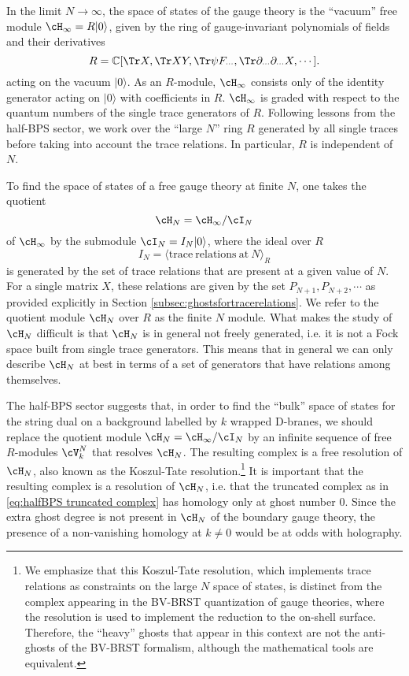 \documentclass[a4paper,12pt]{article}
\begin{document}
In the limit $N \to \infty$, the space of states of the gauge theory is the ``vacuum'' free module $\cH_\infty = R |0\rangle$, given by the ring of gauge-invariant polynomials of fields and their derivatives
\begin{equation}
R = \mathbb{C}[\Tr X, \Tr X Y, \Tr \psi F_{\cdots}, \Tr \partial_{\cdots} \partial_{\cdots} X, \cdots].
\end{equation}
acting on the vacuum $|0 \rangle$. As an $R$-module, $\cH_\infty$ consists only of the identity generator acting on $|0 \rangle$ with coefficients in $R$. $\cH_\infty$ is graded with respect to the quantum numbers of the single trace generators of $R$. Following lessons from the half-BPS sector, we work over the ``large $N$'' ring $R$ generated by all single traces before taking into account the trace relations. In particular, $R$ is independent of $N$.

To find the space of states of a free gauge theory at finite $N$, one takes the quotient
\begin{equation}
\cH_N = \cH_\infty/\cI_N
\end{equation}
of $\cH_\infty$ by the submodule $\cI_N = I_N |0\rangle$, where the ideal over $R$
\begin{equation}
I_N = \langle \mathrm{trace \ relations \ at } \ N \rangle_R
\end{equation}
is generated by the set of trace relations that are present at a given value of $N$. For a single matrix $X$, these relations are given by the set $P_{N+1}, P_{N+2}, \cdots$ as provided explicitly in Section \ref{subsec:ghostsfortracerelations}. We refer to the quotient module $\cH_N$ over $R$ as the finite $N$ module. What makes the study of $\cH_N$ difficult is that $\cH_N$ is in general not freely generated, i.e. it is not a Fock space built from single trace generators. This means that in general we can only describe $\cH_N$ at best in terms of a set of generators that have relations among themselves.

The half-BPS sector suggests that, in order to find the ``bulk'' space of states for the string dual on a background labelled by $k$ wrapped D-branes, we should replace the quotient module $\cH_N = \cH_\infty / \cI_N$ by an infinite sequence of free $R$-modules $\cV_k^N$ that resolves $\cH_N$. The resulting complex is a free resolution of $\cH_N$, also known as the Koszul-Tate resolution.\footnote{We emphasize that this Koszul-Tate resolution, which implements trace relations as constraints on the large $N$ space of states, is distinct from the complex appearing in the BV-BRST quantization of gauge theories, where the resolution is used to implement the reduction to the on-shell surface. Therefore, the ``heavy'' ghosts that appear in this context are not the anti-ghosts of the BV-BRST formalism, although the mathematical tools are equivalent.} It is important that the resulting complex is a resolution of $\cH_N$, i.e. that the truncated complex as in \eqref{eq:halfBPS truncated complex} has homology only at ghost number $0$. Since the extra ghost degree is not present in $\cH_N$ of the boundary gauge theory, the presence of a non-vanishing homology at $k \neq 0$ would be at odds with holography.
\end{document}
